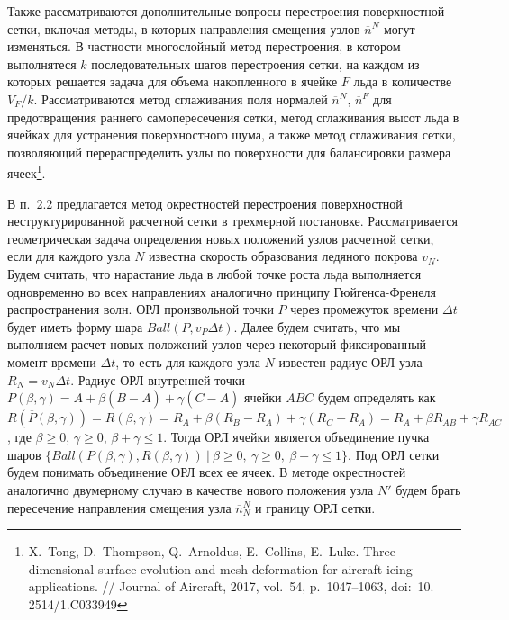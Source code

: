 \documentclass[a4paper,14pt]{extarticle}                     %
\theoremstyle{plain}                                         %
\begin{document}
Также рассматриваются дополнительные вопросы перестроения поверхностной сетки, включая методы, в которых направления смещения узлов $\overline{n}^N$ могут изменяться.
В частности многослойный метод перестроения, в котором выполнятеся $k$ последовательных шагов перестроения сетки, на каждом из которых решается задача для объема накопленного в ячейке $F$ льда в количестве $V_F/k$.
Рассматриваются метод сглаживания поля нормалей $\overline{n}^N$, $\overline{n}^F$ для предотвращения раннего самопересечения сетки, метод сглаживания высот льда в ячейках для устранения поверхностного шума, а также метод сглаживания сетки, позволяющий перераспределить узлы по поверхности для балансировки размера ячеек\footnote[3]{X.~Tong, D.~Thompson, Q.~Arnoldus, E.~Collins, E.~Luke. Three-dimensional surface evolution and mesh deformation for aircraft icing applications. // Journal of Aircraft, 2017, vol.~54, p.~1047–1063, doi:~10.
2514/1.C033949}.


В п.~2.2 предлагается метод окрестностей перестроения поверхностной неструктурированной расчетной сетки в трехмерной постановке.
Рассматривается геометрическая задача определения новых положений узлов расчетной сетки, если для каждого узла $N$ известна скорость образования ледяного покрова $v_N$.
Будем считать, что нарастание льда в любой точке роста льда выполняется одновременно во всех направлениях аналогично принципу Гюйгенса-Френеля распространения волн.
ОРЛ произвольной точки $P$ через промежуток времени $\Delta t$ будет иметь форму шара $Ball(P, v_P\Delta t)$.
Далее будем считать, что мы выполняем расчет новых положений узлов через некоторый фиксированный момент времени $\Delta t$, то есть для каждого узла $N$ известен радиус ОРЛ узла $R_N = v_N \Delta t$.
Радиус ОРЛ внутренней точки $\overline{P}(\beta, \gamma) = \overline{A} + \beta (\overline{B} - \overline{A}) + \gamma (\overline{C} - \overline{A})$ ячейки $ABC$ будем определять как $R(\overline{P}(\beta,\gamma)) = R(\beta,\gamma) = R_A + \beta(R_B - R_A) + \gamma(R_C - R_A) = R_A + \beta R_{AB} + \gamma R_{AC}$, где $\beta \ge 0$, $\gamma \ge 0$, $\beta + \gamma \le 1$.
Тогда ОРЛ ячейки является объединение пучка шаров $\{ Ball(P(\beta, \gamma), R(\beta, \gamma)) \ | \ \beta \ge 0, \ \gamma \ge 0, \ \beta + \gamma \le 1 \}$.
Под ОРЛ сетки будем понимать объединение ОРЛ всех ее ячеек.
В методе окрестностей аналогично двумерному случаю в качестве нового положения узла $N'$ будем брать пересечение направления смещения узла $\overline{n}_N^N$ и границу ОРЛ сетки.
\end{document}
